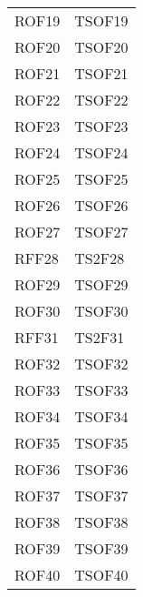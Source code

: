 \documentclass[../PianoDiQualifica_v3.0.0.tex]{subfiles}
\begin{document}
\begin{longtable}[c] { >{\centering\arraybackslash}p{3cm} >{\centering\arraybackslash}p{3cm}}
			\midrule
			\addlinespace[0.3em]
			ROF19 & TSOF19 \\
			\addlinespace[0.3em]
			\midrule
			\addlinespace[0.3em]
			ROF20 & TSOF20 \\
			\addlinespace[0.3em]
			\midrule
			\addlinespace[0.3em]
			ROF21 & TSOF21 \\
			\addlinespace[0.3em]
			\midrule
			\addlinespace[0.3em]
			ROF22 & TSOF22 \\
			\addlinespace[0.3em]
			\midrule
			\addlinespace[0.3em]
			ROF23 & TSOF23 \\
			\addlinespace[0.3em]
			\midrule
			\addlinespace[0.3em]
			ROF24 & TSOF24 \\
			\addlinespace[0.3em]
			\midrule
			\addlinespace[0.3em]
			ROF25 & TSOF25 \\
			\addlinespace[0.3em]
			\midrule
			\addlinespace[0.3em]
			ROF26 & TSOF26 \\
			\addlinespace[0.3em]
			\midrule
			\addlinespace[0.3em]
			ROF27 & TSOF27 \\
			\addlinespace[0.3em]
			\midrule
			\addlinespace[0.3em]
			RFF28 & TS2F28 \\
			\addlinespace[0.3em]
			\midrule
			\addlinespace[0.3em]
			ROF29 & TSOF29 \\
			\addlinespace[0.3em]
			\midrule
			\addlinespace[0.3em]
			ROF30 & TSOF30 \\
			\addlinespace[0.3em]
			\midrule
			\addlinespace[0.3em]
			RFF31 & TS2F31 \\
			\addlinespace[0.3em]
			\midrule
			\addlinespace[0.3em]
			ROF32 & TSOF32 \\
			\addlinespace[0.3em]
			\midrule
			\addlinespace[0.3em]
			ROF33 & TSOF33 \\
			\addlinespace[0.3em]
			\midrule
			\addlinespace[0.3em]
			ROF34 & TSOF34 \\
			\addlinespace[0.3em]
			\midrule
			\addlinespace[0.3em]
			ROF35 & TSOF35 \\
			\addlinespace[0.3em]
			\midrule
			\addlinespace[0.3em]
			ROF36 & TSOF36 \\
			\addlinespace[0.3em]
			\midrule
			\addlinespace[0.3em]
			ROF37 & TSOF37 \\
			\addlinespace[0.3em]
			\midrule
			\addlinespace[0.3em]
			ROF38 & TSOF38 \\
			\addlinespace[0.3em]
			\midrule
			\addlinespace[0.3em]
			ROF39 & TSOF39 \\
			\addlinespace[0.3em]
			\midrule
			\addlinespace[0.3em]
			ROF40 & TSOF40 \\

\end{longtable}
\end{document}
